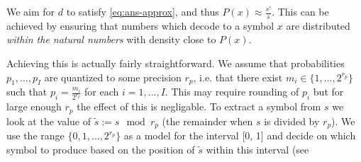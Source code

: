 \documentclass{article}
\begin{document}
We aim for $d$ to satisfy \cref{eq:ans-approx}, and thus $P(x)\approx
\frac{s'}{s}$. This can be achieved by ensuring that numbers which decode to a
symbol $x$ are distributed \emph{within the natural numbers} with density close
to $P(x)$.

Achieving this is actually fairly straightforward. We assume that probabilities
$p_1, \ldots, p_I$ are quantized to some precision $r_p$, i.e.  that there
exist $m_i\in\{1,\ldots,2^{r_p}\}$ such that $p_i = \frac{m_i}{2^{r_p}}$ for
each $i=1,\ldots,I$. This may require rounding of $p_i$ but for large enough
$r_p$ the effect of this is negligable. To extract a symbol from $s$ we look at
the value of $\tilde s := s \mod r_p$ (the remainder when $s$ is divided by
$r_p$). We use the range $\{0, 1,\ldots,2^{r_p}\}$ as a model for the interval
[0, 1] and decide on which symbol to produce based on the position of $\tilde
s$ within this interval (see

\printbibliography
\end{document}
